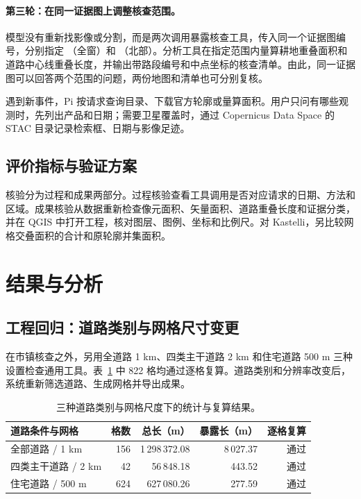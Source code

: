 \paragraph{第三轮：在同一证据图上调整核查范围。}
模型没有重新找影像或分割，而是两次调用暴露核查工具，传入同一个证据图编号，分别指定 （全窗）和 （北部）。分析工具在指定范围内量算耕地重叠面积和道路中心线重叠长度，并输出带路段编号和中点坐标的核查清单。由此，同一证据图可以回答两个范围的问题，两份地图和清单也可分别复核。

遇到新事件，Pi 按请求查询目录、下载官方轮廓或量算面积。用户只问有哪些观测时，先列出产品和日期；需要卫星覆盖时，通过 Copernicus Data Space 的 STAC 目录记录检索框、日期与影像足迹\cite{cdse-stac}。

\subsection{评价指标与验证方案}
核验分为过程和成果两部分。过程核验查看工具调用是否对应请求的日期、方法和区域。成果核验从数据重新检查像元面积、矢量面积、道路重叠长度和证据分类，并在 QGIS 中打开工程，核对图层、图例、坐标和比例尺。对 Kastelli，另比较网格交叠面积的合计和原轮廓并集面积。

\section{结果与分析}



\subsection{工程回归：道路类别与网格尺寸变更}
在市镇核查之外，另用全道路 1 km、四类主干道路 2 km 和住宅道路 500 m 三种设置检查通用工具。表~\ref{tab:product-runs} 中 822 格均通过逐格复算。道路类别和分辨率改变后，系统重新筛选道路、生成网格并导出成果。

\begin{table}[htbp]
\centering
\caption{三种道路类别与网格尺度下的统计与复算结果。}
\label{tab:product-runs}
\small
\begin{tabular*}{\linewidth}{@{\extracolsep{\fill}}lrrrr@{}}
\toprule
道路条件与网格 & 格数 & 总长（m） & 暴露长（m） & 逐格复算\\
\midrule
全部道路 / 1 km &156&1\,298\,372.08&8\,027.37&通过\\
四类主干道路 / 2 km &42&56\,848.18&443.52&通过\\
住宅道路 / 500 m &624&627\,080.26&277.59&通过\\
\bottomrule
\end{tabular*}
\end{table}


